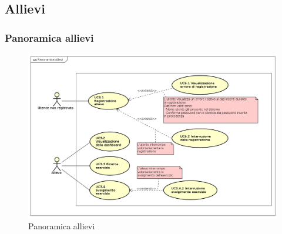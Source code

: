 \subsection{Allievi}
\subsubsection{Panoramica allievi}
\begin{figure}[H]
\centering
\includegraphics[width=17cm]{img/Panoramica Allievi.png} 
\caption{Panoramica allievi}\label{fig:31}
\end{figure}

